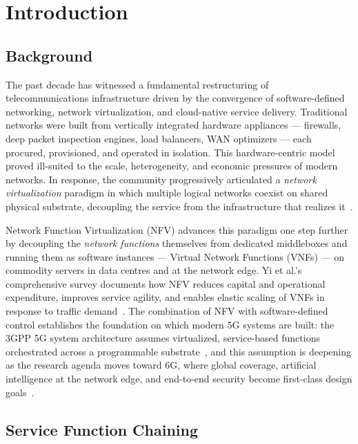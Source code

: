 \chapter{Introduction}

\section{Background}

The past decade has witnessed a fundamental restructuring of
telecommunications infrastructure driven by the convergence of
software-defined networking, network virtualization, and cloud-native
service delivery. Traditional networks were built from vertically
integrated hardware appliances --- firewalls, deep packet inspection
engines, load balancers, WAN optimizers --- each procured, provisioned,
and operated in isolation. This hardware-centric model proved ill-suited
to the scale, heterogeneity, and economic pressures of modern networks.
In response, the community progressively articulated a
\textit{network virtualization} paradigm in which multiple logical
networks coexist on shared physical substrate, decoupling the service
from the infrastructure that realizes it~\cite{chowdhury_survey_2010}.

Network Function Virtualization (NFV) advances this paradigm one step
further by decoupling the \emph{network functions} themselves from
dedicated middleboxes and running them as software instances --- Virtual
Network Functions (VNFs) --- on commodity servers in data centres and at
the network edge. Yi et al.'s comprehensive survey documents how NFV
reduces capital and operational expenditure, improves service agility,
and enables elastic scaling of VNFs in response to traffic
demand~\cite{yi_comprehensive_2018}. The combination of NFV with
software-defined control establishes the foundation on which modern
5G systems are built: the 3GPP 5G system architecture assumes
virtualized, service-based functions orchestrated across a
programmable substrate~\cite{noauthor_5g_nodate}, and this assumption is
deepening as the research agenda moves toward 6G, where global
coverage, artificial intelligence at the network edge, and
end-to-end security become first-class design
goals~\cite{you_towards_2021}.

\section{Service Function Chaining}


